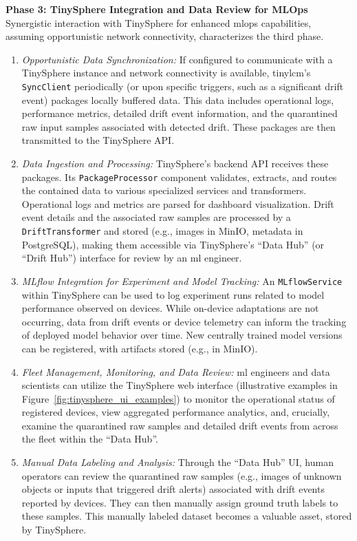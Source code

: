 \textbf{Phase 3: TinySphere Integration and Data Review for MLOps}
Synergistic interaction with TinySphere for enhanced \gls{mlops} capabilities, assuming opportunistic network connectivity, characterizes the third phase.
\begin{enumerate}
    \item \textit{Opportunistic Data Synchronization:} If configured to communicate with a TinySphere instance and network connectivity is available, \gls{tinylcm}'s \texttt{SyncClient} periodically (or upon specific triggers, such as a significant drift event) packages locally buffered data. This data includes operational logs, performance metrics, detailed drift event information, and the quarantined raw input samples associated with detected drift. These packages are then transmitted to the TinySphere API.
    \item \textit{Data Ingestion and Processing:} TinySphere's backend API receives these packages. Its \texttt{PackageProcessor} component validates, extracts, and routes the contained data to various specialized services and transformers. Operational logs and metrics are parsed for dashboard visualization. Drift event details and the associated raw samples are processed by a \texttt{DriftTransformer} and stored (e.g., images in MinIO, metadata in PostgreSQL), making them accessible via TinySphere's ``Data Hub'' (or ``Drift Hub'') interface for review by an \gls{ml} engineer.
    \item \textit{MLflow Integration for Experiment and Model Tracking:} An \texttt{MLflowService} within TinySphere can be used to log experiment runs related to model performance observed on devices. While on-device adaptations are not occurring, data from drift events or device telemetry can inform the tracking of deployed model behavior over time. New centrally trained model versions can be registered, with artifacts stored (e.g., in MinIO).
    \item \textit{Fleet Management, Monitoring, and Data Review:} \gls{ml} engineers and data scientists can utilize the TinySphere web interface (illustrative examples in Figure~\ref{fig:tinysphere_ui_examples}) to monitor the operational status of registered devices, view aggregated performance analytics, and, crucially, examine the quarantined raw samples and detailed drift events from across the fleet within the ``Data Hub''.
    \item \textit{Manual Data Labeling and Analysis:} Through the ``Data Hub'' UI, human operators can review the quarantined raw samples (e.g., images of unknown objects or inputs that triggered drift alerts) associated with drift events reported by devices. They can then manually assign ground truth labels to these samples. This manually labeled dataset becomes a valuable asset, stored by TinySphere.

\end{enumerate}
